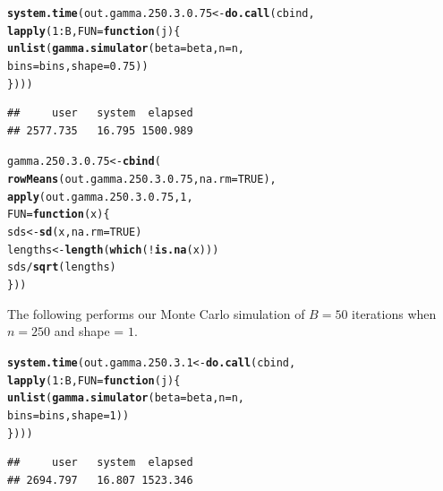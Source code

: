 \documentclass[11pt]{article}\usepackage[]{graphicx}\usepackage[]{color}
\makeatletter
\newcommand{\hlnum}[1]{\textcolor[rgb]{0.686,0.059,0.569}{#1}}%
\newcommand{\hlopt}[1]{\textcolor[rgb]{0,0,0}{#1}}%
\newcommand{\hlstd}[1]{\textcolor[rgb]{0.345,0.345,0.345}{#1}}%
\newcommand{\hlkwa}[1]{\textcolor[rgb]{0.161,0.373,0.58}{\textbf{#1}}}%
\newcommand{\hlkwb}[1]{\textcolor[rgb]{0.69,0.353,0.396}{#1}}%
\newcommand{\hlkwc}[1]{\textcolor[rgb]{0.333,0.667,0.333}{#1}}%
\newcommand{\hlkwd}[1]{\textcolor[rgb]{0.737,0.353,0.396}{\textbf{#1}}}%
\newenvironment{kframe}{%
 \def\at@end@of@kframe{}%
 \ifinner\ifhmode%
  \def\at@end@of@kframe{\end{minipage}}%
  \begin{minipage}{\columnwidth}%
 \fi\fi%
 \def\FrameCommand##1{\hskip\@totalleftmargin \hskip-\fboxsep
 \colorbox{shadecolor}{##1}\hskip-\fboxsep
     \hskip-\linewidth \hskip-\@totalleftmargin \hskip\columnwidth}%
 \MakeFramed {\advance\hsize-\width
   \@totalleftmargin\z@ \linewidth\hsize
   \@setminipage}}%
 {\par\unskip\endMakeFramed%
 \at@end@of@kframe}
\newenvironment{knitrout}{}{} %
\makeatother
\begin{document}
\begin{knitrout}
\color{fgcolor}\begin{kframe}
\begin{alltt}
\hlkwd{system.time}\hlstd{(out.gamma.250.3.0.75} \hlkwb{<-} \hlkwd{do.call}\hlstd{(cbind,}
  \hlkwd{lapply}\hlstd{(}\hlnum{1}\hlopt{:}\hlstd{B,} \hlkwc{FUN} \hlstd{=} \hlkwa{function}\hlstd{(}\hlkwc{j}\hlstd{)\{}
    \hlkwd{unlist}\hlstd{(}\hlkwd{gamma.simulator}\hlstd{(}\hlkwc{beta} \hlstd{= beta,} \hlkwc{n} \hlstd{= n,}
      \hlkwc{bins} \hlstd{= bins,} \hlkwc{shape} \hlstd{=} \hlnum{0.75}\hlstd{))}
\hlstd{\})))}
\end{alltt}
\begin{verbatim}
##     user   system  elapsed 
## 2577.735   16.795 1500.989
\end{verbatim}
\end{kframe}
\end{knitrout}

\begin{knitrout}
\color{fgcolor}\begin{kframe}
\begin{alltt}
\hlstd{gamma.250.3.0.75} \hlkwb{<-} \hlkwd{cbind}\hlstd{(}
  \hlkwd{rowMeans}\hlstd{(out.gamma.250.3.0.75,} \hlkwc{na.rm} \hlstd{=} \hlnum{TRUE}\hlstd{),}
  \hlkwd{apply}\hlstd{(out.gamma.250.3.0.75,} \hlnum{1}\hlstd{,}
  \hlkwc{FUN} \hlstd{=} \hlkwa{function}\hlstd{(}\hlkwc{x}\hlstd{)\{}
    \hlstd{sds} \hlkwb{<-} \hlkwd{sd}\hlstd{(x,} \hlkwc{na.rm} \hlstd{=} \hlnum{TRUE}\hlstd{)}
    \hlstd{lengths} \hlkwb{<-} \hlkwd{length}\hlstd{(}\hlkwd{which}\hlstd{(}\hlopt{!}\hlkwd{is.na}\hlstd{(x)))}
    \hlstd{sds} \hlopt{/} \hlkwd{sqrt}\hlstd{(lengths)}
  \hlstd{\}))}
\end{alltt}
\end{kframe}
\end{knitrout}

The following performs our Monte Carlo simulation of $B = 50$ iterations 
when $n = 250$ and shape = $1$.

\begin{knitrout}
\color{fgcolor}\begin{kframe}
\begin{alltt}
\hlkwd{system.time}\hlstd{(out.gamma.250.3.1} \hlkwb{<-} \hlkwd{do.call}\hlstd{(cbind,}
  \hlkwd{lapply}\hlstd{(}\hlnum{1}\hlopt{:}\hlstd{B,} \hlkwc{FUN} \hlstd{=} \hlkwa{function}\hlstd{(}\hlkwc{j}\hlstd{)\{}
    \hlkwd{unlist}\hlstd{(}\hlkwd{gamma.simulator}\hlstd{(}\hlkwc{beta} \hlstd{= beta,} \hlkwc{n} \hlstd{= n,}
      \hlkwc{bins} \hlstd{= bins,} \hlkwc{shape} \hlstd{=} \hlnum{1}\hlstd{))}
\hlstd{\})))}
\end{alltt}
\begin{verbatim}
##     user   system  elapsed 
## 2694.797   16.807 1523.346
\end{verbatim}
\end{kframe}
\end{knitrout}
\end{document}
